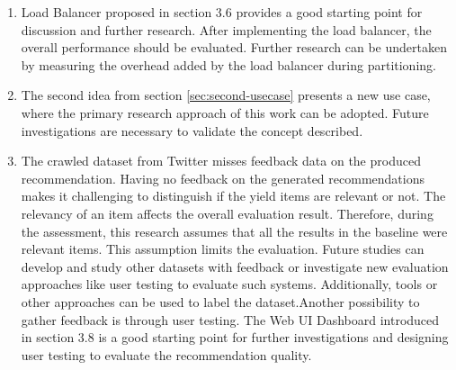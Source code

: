 \begin{enumerate}
    \item Load Balancer proposed in section 3.6 provides a good starting point for discussion and further research. After implementing the load balancer, the overall performance should be evaluated. Further research can be undertaken by measuring the overhead added by the load balancer during partitioning.
    
    \item The second idea from section \ref{sec:second-usecase} presents a new use case, where the primary research approach of this work can be adopted. Future investigations are necessary to validate the concept described.
    
    \item The crawled dataset from Twitter misses feedback data on the produced recommendation. Having no feedback on the generated recommendations makes it challenging to distinguish if the yield items are relevant or not. The relevancy of an item affects the overall evaluation result. Therefore, during the assessment, this research assumes that all the results in the baseline were relevant items. This assumption limits the evaluation. Future studies can develop and study other datasets with feedback or investigate new evaluation approaches like user testing to evaluate such systems. Additionally, tools or other approaches can be used to label the dataset.Another possibility to gather feedback is through user testing. The Web UI Dashboard introduced in section 3.8 is a good starting point for further investigations and designing user testing to evaluate the recommendation quality.
\end{enumerate}